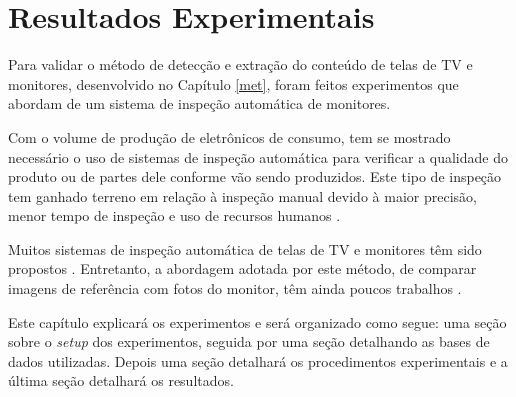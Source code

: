 \chapter{Resultados Experimentais}


Para validar o método de detecção e extração do conteúdo de telas de TV e monitores, desenvolvido no Capítulo \ref{met}, foram feitos experimentos que abordam  de um sistema de inspeção automática de monitores. 


Com o volume de produção de eletrônicos de consumo, tem se mostrado necessário o uso de sistemas de inspeção automática para verificar a qualidade do produto ou de partes dele conforme vão sendo produzidos. Este tipo de inspeção tem ganhado terreno em relação à inspeção manual devido à maior precisão,  menor tempo de inspeção e uso de recursos humanos \cite{vantagemauto}.

Muitos sistemas de inspeção automática de telas de TV e monitores têm sido propostos \cite{vantagemauto,sistauto00,sisauto01,sisauto02}. Entretanto, a abordagem adotada por este método, de comparar imagens de referência com fotos do monitor, têm ainda poucos trabalhos \cite{inspect}.

Este capítulo explicará 
os experimentos e será organizado como segue: uma seção sobre o \textit{setup} dos experimentos, seguida por uma seção detalhando as bases de dados utilizadas. Depois uma seção detalhará os procedimentos experimentais e a última seção detalhará os resultados.



